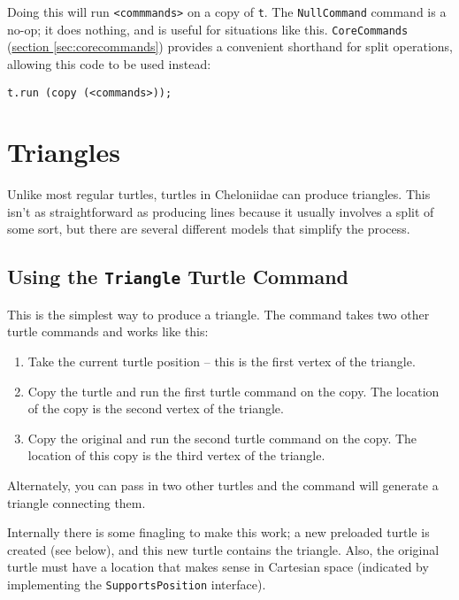 \documentclass{report}
\newcommand{\Ref}[2]{\hyperref[#2]{#1 \ref*{#2}}}
\begin{document}
      Doing this will run \verb|<commmands>| on a copy of {\tt t}. The {\tt NullCommand} command is a no-op; it does nothing, and is useful for situations like
      this. {\tt CoreCommands} (\Ref{section}{sec:corecommands}) provides a convenient shorthand for split operations, allowing this code to be used instead:

\begin{verbatim}
t.run (copy (<commands>));
\end{verbatim}

\chapter {Triangles} \label{sec:triangles}
    Unlike most regular turtles, turtles in Cheloniidae can produce triangles. This isn't as straightforward as producing lines because it usually involves a
    split of some sort, but there are several different models that simplify the process.

\section {Using the {\tt Triangle} Turtle Command} \label{sec:using-the---tt-triangle--turtle-command}
      This is the simplest way to produce a triangle. The command takes two other turtle commands and works like this:

\begin{enumerate}
\item Take the current turtle position -- this is the first vertex of the triangle.
\item Copy the turtle and run the first turtle command on the copy. The location of the copy is the second vertex of the triangle.
\item Copy the original and run the second turtle command on the copy. The location of this copy is the third vertex of the triangle.
\end{enumerate}

      Alternately, you can pass in two other turtles and the command will generate a triangle connecting them.

      Internally there is some finagling to make this work; a new preloaded turtle is created (see below), and this new turtle contains the triangle. Also, the
      original turtle must have a location that makes sense in Cartesian space (indicated by implementing the {\tt SupportsPosition} interface).
\end{document}
